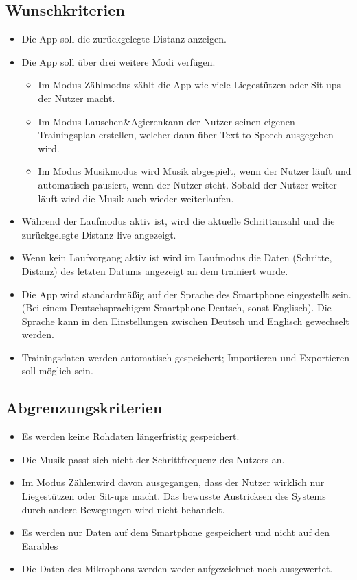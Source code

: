\documentclass[a4paper,12pt]{article}
\begin{document}
\subsection{Wunschkriterien}
  \begin{itemize}
    \item Die App soll die zurückgelegte Distanz anzeigen.
    \item Die App soll über drei weitere Modi verfügen.
      \begin{itemize}
        \item\text Im Modus \glqq Zählmodus\grqq{} zählt die App wie viele Liegestützen oder Sit-ups der Nutzer macht.
        \item\text  Im Modus \glqq Lauschen\&Agieren\grqq{}kann der Nutzer seinen eigenen Trainingsplan erstellen, welcher dann über Text to Speech ausgegeben wird.
        \item\text  Im Modus \glqq Musikmodus\grqq{} wird Musik abgespielt, wenn der Nutzer läuft und automatisch pausiert, wenn der Nutzer steht. Sobald der Nutzer weiter läuft wird die Musik auch wieder weiterlaufen.
      \end{itemize}
    \item\text Während der \glqq Laufmodus \grqq{} aktiv ist, wird die aktuelle Schrittanzahl und die zurückgelegte Distanz live angezeigt.
    \item\text Wenn kein Laufvorgang aktiv ist wird im Laufmodus die Daten (Schritte, Distanz) des letzten Datums angezeigt an dem trainiert wurde. %
    \item\text Die App wird standardmäßig auf der Sprache des Smartphone eingestellt sein. (Bei einem Deutschsprachigem Smartphone Deutsch, sonst Englisch). Die Sprache kann in den Einstellungen zwischen Deutsch und Englisch gewechselt werden. 
    \item\text Trainingsdaten werden automatisch gespeichert; Importieren und Exportieren soll möglich sein.
  \end{itemize}
  \subsection{Abgrenzungskriterien}
  \begin{itemize}
    \item Es werden keine \Gls{Rohdaten} längerfristig gespeichert.
    \item Die Musik passt sich nicht der \Gls{Schrittfrequenz} des Nutzers an.
    \item Im Modus \glqq Zählen\grqq{}wird davon ausgegangen, dass der Nutzer wirklich nur Liegestützen oder Sit-ups macht. Das bewusste Austricksen des Systems durch andere Bewegungen wird nicht behandelt.
    \item Es werden nur Daten auf dem Smartphone gespeichert und nicht auf den \Gls{Earables}
    \item Die Daten des Mikrophons werden weder aufgezeichnet noch ausgewertet.
  \end{itemize}
\end{document}
